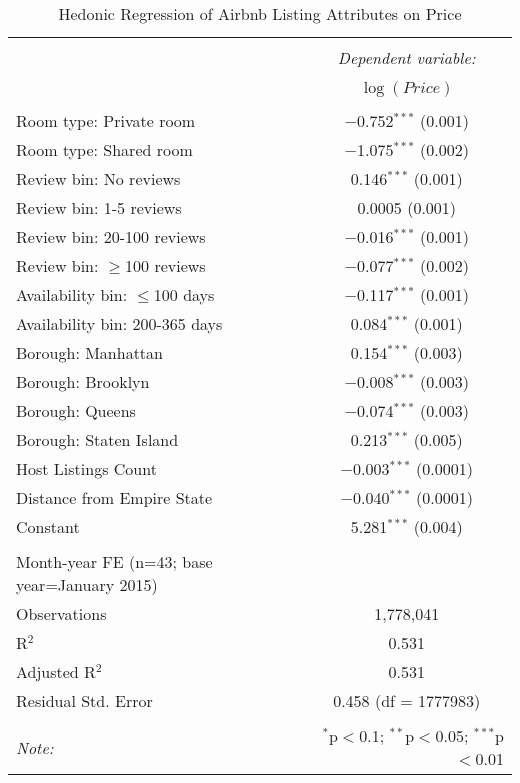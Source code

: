 \documentclass[12pt]{article}
\begin{document}
		\begin{table}[!htbp] 
			\begin{center} %
  				\caption{Hedonic Regression of Airbnb Listing Attributes on Price}
  				\label{tab:Hedonic} 
				\begin{tabular}{@{\extracolsep{5pt}}lc} 
					\\[-1.8ex]\hline 
					\hline \\[-1.8ex] 
 					& \multicolumn{1}{c}{\textit{Dependent variable:}} \\ 
					\cline{2-2} 
					\\[-1.8ex] & $\log(Price)$ \\ 
					\hline \\[-1.8ex]
  					Room type: Private room & $-$0.752$^{***}$ (0.001) \\ 
  					Room type: Shared room & $-$1.075$^{***}$ (0.002) \\ 
  					Review bin: No reviews & 0.146$^{***}$ (0.001) \\ 
  					Review bin: 1-5 reviews & 0.0005 (0.001) \\ 
  					Review bin: 20-100 reviews & $-$0.016$^{***}$ (0.001) \\ 
  					Review bin: $\geq$100 reviews & $-$0.077$^{***}$ (0.002) \\ 
  					Availability bin: $\leq$100 days & $-$0.117$^{***}$ (0.001) \\ 
  					Availability bin: 200-365 days & 0.084$^{***}$ (0.001) \\ 
  					Borough: Manhattan & 0.154$^{***}$ (0.003) \\ 
  					Borough: Brooklyn & $-$0.008$^{***}$ (0.003) \\ 
  					Borough: Queens & $-$0.074$^{***}$ (0.003) \\ 
  					Borough: Staten Island & 0.213$^{***}$ (0.005) \\ 
  					Host Listings Count & $-$0.003$^{***}$ (0.0001) \\ 
  					Distance from Empire State & $-$0.040$^{***}$ (0.0001) \\ 
  					Constant & 5.281$^{***}$ (0.004) \\ 
 					\hline \\[-1.8ex] 
					Month-year FE (n=43; base year=January 2015)\\
					Observations & 1,778,041 \\ 
					R$^{2}$ & 0.531 \\ 
					Adjusted R$^{2}$ & 0.531 \\ 
					Residual Std. Error & 0.458 (df = 1777983) \\ 
					\hline 
					\hline \\[-1.8ex] 
					\textit{Note:}  & \multicolumn{1}{r}{$^{*}$p$<$0.1; $^{**}$p$<$0.05; $^{***}$p$<$0.01} \\ 
				\end{tabular} 
			\end{center}
		\end{table}
		
\end{document}

